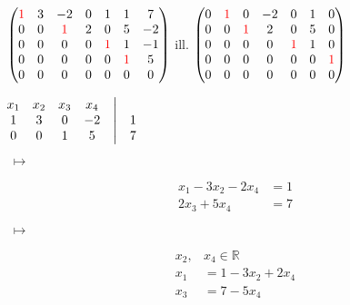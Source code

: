 \documentclass[../szamtud.tex]{subfiles}
\begin{document}
            $ \begin{pmatrix}
                \textcolor{red}{1} & 3 & -2 & 0 & 1 & 1 & 7 \\
                0 & 0 & \textcolor{red}{1} & 2 & 0 & 5 & -2 \\
                0 & 0 & 0 & 0 & \textcolor{red}{1} & 1 & -1 \\
                0 & 0 & 0 & 0 & 0 & \textcolor{red}{1} & 5 \\
                0 & 0 & 0 & 0 & 0 & 0 & 0 
            \end{pmatrix}  $ ill. 
            $ \begin{pmatrix}
                0 & \textcolor{red}{1} & 0 & -2 & 0 & 1 & 0 \\
                0 & 0 & \textcolor{red}{1} & 2 & 0 & 5 & 0 \\
                0 & 0 & 0 & 0 & \textcolor{red}{1} & 1 & 0 \\
                0 & 0 & 0 & 0 & 0 & 0 & \textcolor{red}{1} \\
                0 & 0 & 0 & 0 & 0 & 0 & 0 
            \end{pmatrix}  $


            \begin{minipage}{.25\linewidth}
                $ \begin{matrix}
                    x_1 & x_2 & x_3 & x_4 & \bigm| &  \\
                    1 & 3 & 0 & -2 & \bigm| & 1 \\
                    0 & 0 & 1 & 5 & \bigm| & 7 
                \end{matrix}  $
            \end{minipage}
            \begin{minipage}{.05\linewidth}
                $\;\mapsto\;$
            \end{minipage}
            \begin{minipage}{.15\linewidth}
                \begin{align*}
                    x_1-3x_2-2x_4 &= 1 \\
                    2x_3+5x_4 &= 7
                \end{align*}
            \end{minipage}
            \begin{minipage}{.05\linewidth}
                $\;\mapsto\;$
            \end{minipage}
            \begin{minipage}{.1\linewidth}
                \begin{align*}
                    x_2,& x_4 \in \mathbb{R} \\
                    x_1 &= 1-3x_2+2x_4 \\
                    x_3 &= 7 - 5x_4
                \end{align*}
            \end{minipage}
            
\end{document}
